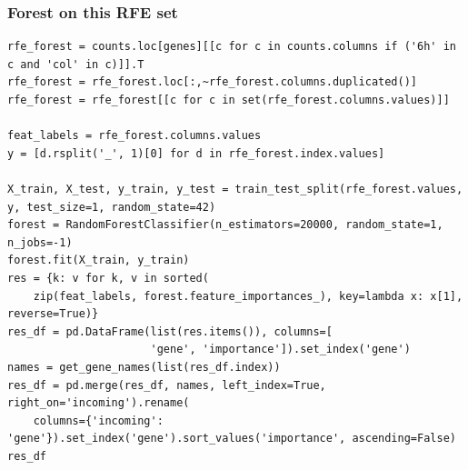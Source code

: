 \documentclass[11pt]{article}
\begin{document}
\subsubsection{Forest on this RFE set}
\label{sec:org01acb54}

\begin{verbatim}
rfe_forest = counts.loc[genes][[c for c in counts.columns if ('6h' in c and 'col' in c)]].T
rfe_forest = rfe_forest.loc[:,~rfe_forest.columns.duplicated()]
rfe_forest = rfe_forest[[c for c in set(rfe_forest.columns.values)]]

feat_labels = rfe_forest.columns.values
y = [d.rsplit('_', 1)[0] for d in rfe_forest.index.values]

X_train, X_test, y_train, y_test = train_test_split(rfe_forest.values, y, test_size=1, random_state=42)
forest = RandomForestClassifier(n_estimators=20000, random_state=1, n_jobs=-1)
forest.fit(X_train, y_train)
res = {k: v for k, v in sorted(
    zip(feat_labels, forest.feature_importances_), key=lambda x: x[1], reverse=True)}
res_df = pd.DataFrame(list(res.items()), columns=[
                      'gene', 'importance']).set_index('gene')
names = get_gene_names(list(res_df.index))
res_df = pd.merge(res_df, names, left_index=True, right_on='incoming').rename(
    columns={'incoming': 'gene'}).set_index('gene').sort_values('importance', ascending=False)
res_df
\end{verbatim}
\end{document}
